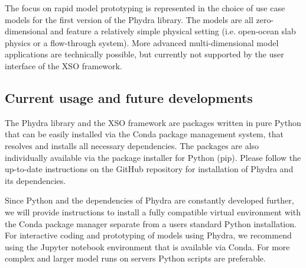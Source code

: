 \documentclass[journal abbreviation, manuscript]{copernicus}
\begin{document}

The focus on rapid model prototyping is represented in the choice of use case models for the first version of the Phydra library. The models are all zero-dimensional and feature a relatively simple physical setting (i.e. open-ocean slab physics or a flow-through system). More advanced multi-dimensional model applications are technically possible, but currently not supported by the user interface of the XSO framework.



\subsection{Current usage and future developments}
The Phydra library and the XSO framework are packages written in pure Python that can be easily installed via the Conda package management system, that resolves and installs all necessary dependencies. The packages are also individually available via the package installer for Python (pip). Please follow the up-to-date instructions on the GitHub repository for installation of Phydra and its dependencies.

Since Python and the dependencies of Phydra are constantly developed further, we will provide instructions to install a fully compatible virtual environment with the Conda package manager separate from a users standard Python installation. For interactive coding and prototyping of models using Phydra, we recommend using the Jupyter notebook environment that is available via Conda. For more complex and larger model runs on servers Python scripts are preferable.
\end{document}
